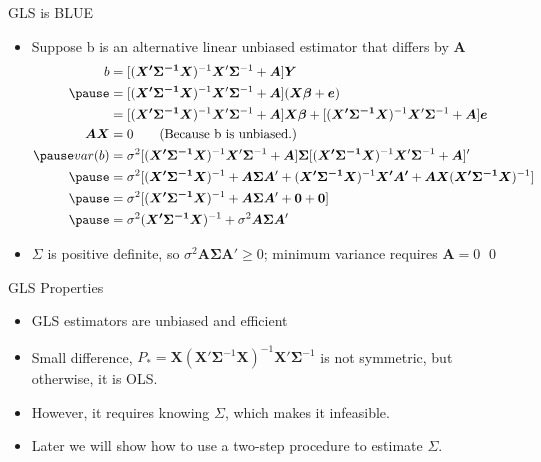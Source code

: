 \documentclass[aspectratio=169, handout]{beamer}
\numberwithin{equation}{section}
\begin{document}
\begin{frame}{GLS is BLUE}
\begin{itemize}
\item Suppose b is an alternative linear unbiased estimator that differs by $\bm{A}$
\begin{align*}
b&=[(\bm{X'\Sigma^{-1} X})^{-1}\bm{X}'\bm{\Sigma}^{-1}+\bm{A}]\bm{Y}\\\pause
&=[(\bm{X'\Sigma^{-1} X})^{-1}\bm{X}'\bm{\Sigma}^{-1}+\bm{A}](\bm{X\beta}+\bm{e})\\
&=[(\bm{X'\Sigma^{-1} X})^{-1}\bm{X}'\bm{\Sigma}^{-1}+\bm{A}]\bm{X\beta}+[(\bm{X'\Sigma^{-1} X})^{-1}\bm{X}'\bm{\Sigma}^{-1}+\bm{A}]\bm{e}\\
\bm{AX}&=0\tag{Because b is unbiased.}\\ \pause
var(b)&=\sigma^2[(\bm{X'\Sigma^{-1} X})^{-1}\bm{X}'\bm{\Sigma}^{-1}+\bm{A}]\bm{\Sigma} [(\bm{X'\Sigma^{-1} X})^{-1}\bm{X}'\bm{\Sigma}^{-1}+\bm{A}]'\\\pause
&=\sigma^2[(\bm{X'\Sigma^{-1} X})^{-1} + \bm{A\Sigma A}'+(\bm{X'\Sigma^{-1} X})^{-1}\bm{X'A'}+\bm{AX}(\bm{X'\Sigma^{-1} X})^{-1}]\\\pause
&=\sigma^2[(\bm{X'\Sigma^{-1} X})^{-1} + \bm{A\Sigma A}'+\bm{0}+\bm{0}]\\\pause
&=\sigma^2(\bm{X'\Sigma^{-1} X})^{-1} + \sigma^2\bm{A\Sigma A}'
\end{align*}
\item $\Sigma$ is positive definite, so $\sigma^2\bm{A\Sigma A}'\geq 0$; minimum variance requires $\bm{A}=0$ \qed
\end{itemize}
\end{frame}

\begin{frame}{GLS Properties}
\begin{itemize}
\item GLS estimators are unbiased and efficient
\item Small difference, $P_*=\bm{X}(\bm{X}'\bm{\Sigma}^{-1}\bm{X})^{-1}\bm{X}'\bm{\Sigma}^{-1}$ is not symmetric, but otherwise, it is OLS.
\item However, it requires knowing $\Sigma$, which makes it infeasible.
\item Later we will show how to use a two-step procedure to estimate $\Sigma$.
\end{itemize}
\end{frame}
\end{document}
